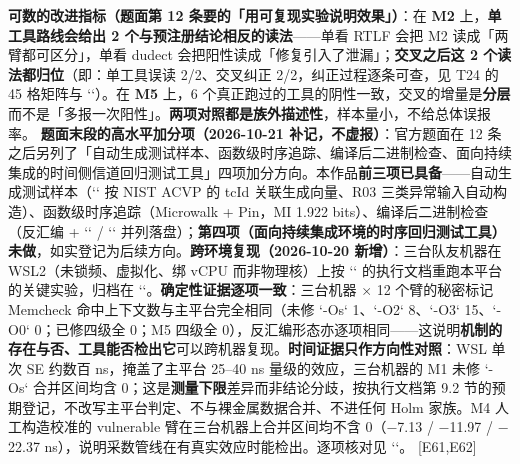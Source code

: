 \documentclass[UTF8,fontset=fandol,11pt,a4paper]{ctexart}
\begin{document}
\textbf{可数的改进指标（题面第 12 条要的「用可复现实验说明效果」）}：在 \textbf{M2} 上，\textbf{单工具路线会给出 2 个与预注册结论相反的读法}——单看 RTLF 会把 M2 读成「两臂都可区分」，单看 dudect 会把阳性读成「修复引入了泄漏」；\textbf{交叉之后这 2 个读法都归位}（即：单工具误读 2/2、交叉纠正 2/2，纠正过程逐条可查，见 T24 的 45 格矩阵与 `\texttt{}`）。在 \textbf{M5} 上，6 个真正跑过的工具的阴性一致，交叉的增量是\textbf{分层}而不是「多报一次阳性」。\textbf{两项对照都是族外描述性}，样本量小，不给总体误报率。
\textbf{题面末段的高水平加分项（2026-10-21 补记，不虚报）}：官方题面在 12 条之后另列了「自动生成测试样本、函数级时序追踪、编译后二进制检查、面向持续集成的时间侧信道回归测试工具」四项加分方向。本作品\textbf{前三项已具备}——自动生成测试样本（`\texttt{}` 按 NIST ACVP 的 tcId 关联生成向量、R03 三类异常输入自动构造）、函数级时序追踪（Microwalk + Pin，MI 1.922 bits）、编译后二进制检查（反汇编 + `\texttt{}` / `\texttt{}` 并列落盘）；\textbf{第四项（面向持续集成环境的时序回归测试工具）未做}，如实登记为后续方向。\textbf{跨环境复现（2026-10-20 新增）}：三台队友机器在 WSL2（未锁频、虚拟化、绑 vCPU 而非物理核）上按 `\texttt{}` 的执行文档重跑本平台的关键实验，归档在 `\texttt{}`。\textbf{确定性证据逐项一致}：三台机器 \texorpdfstring{$\times$}{x} 12 个臂的秘密标记 Memcheck 命中上下文数与主平台完全相同（未修 `-Os` 1、`-O2` 8、`-O3` 15、`-O0` 0；已修四级全 0；M5 四级全 0），反汇编形态亦逐项相同——这说明\textbf{机制的存在与否、工具能否检出它}可以跨机器复现。\textbf{时间证据只作方向性对照}：WSL 单次 SE 约数百 ns，掩盖了主平台 25–40 ns 量级的效应，三台机器的 M1 未修 `-Os` 合并区间均含 0；这是\textbf{测量下限}差异而非结论分歧，按执行文档第 9.2 节的预期登记，不改写主平台判定、不与裸金属数据合并、不进任何 Holm 家族。M4 人工构造校准的 vulnerable 臂在三台机器上合并区间均不含 0（\texorpdfstring{$-$}{-}7.13 / \texorpdfstring{$-$}{-}11.97 / \texorpdfstring{$-$}{-}22.37 ns），说明采数管线在有真实效应时能检出。逐项核对见 `\texttt{}`。 [E61,E62]
\end{document}
